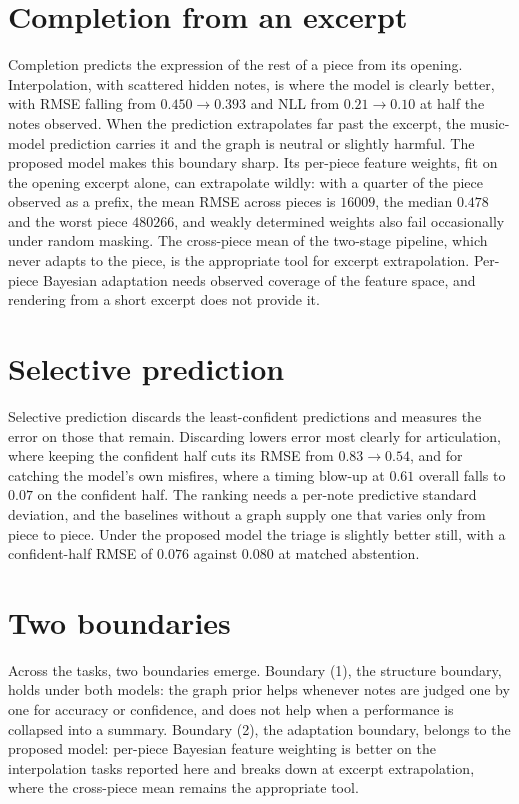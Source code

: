 \documentclass[11pt,a4paper]{report}
\begin{document}
\section{Completion from an excerpt}
Completion predicts the expression of the rest of a piece from its opening.
Interpolation, with scattered hidden notes, is where the model is clearly
better, with RMSE falling from $0.450 \to 0.393$ and NLL from $0.21 \to 0.10$
at half the notes observed. When the prediction extrapolates far past the
excerpt, the music-model prediction carries it and the graph is neutral or
slightly harmful. The proposed model makes this boundary sharp. Its per-piece
feature weights, fit on the opening excerpt alone, can extrapolate wildly:
with a quarter of the piece observed as a prefix, the mean RMSE across
pieces is $16009$, the median $0.478$ and the worst piece $480266$, and
weakly determined weights also fail occasionally under random masking. The
cross-piece mean of the two-stage pipeline, which never adapts to the piece,
is the appropriate tool for excerpt extrapolation. Per-piece Bayesian
adaptation needs observed coverage of the feature space, and rendering from a
short excerpt does not provide it.

\section{Selective prediction}
Selective prediction discards the least-confident predictions and measures
the error on those that remain. Discarding lowers error most clearly for
articulation, where keeping the confident half cuts its RMSE from $0.83 \to
0.54$, and for catching the model's own misfires, where a timing blow-up at
$0.61$ overall falls to $0.07$ on the confident half. The ranking needs a
per-note predictive standard deviation, and the baselines without a graph
supply one that varies only from piece to piece. Under the proposed model the triage is
slightly better still, with a confident-half RMSE of $0.076$ against $0.080$
at matched abstention.

\section{Two boundaries}\label{sec:boundary}
Across the tasks, two boundaries emerge. Boundary (1), the structure
boundary, holds under both models: the graph prior helps whenever notes are
judged one by one for accuracy or confidence, and does not help when a
performance is collapsed into a summary. Boundary (2), the adaptation
boundary, belongs to the proposed model: per-piece Bayesian feature weighting
is better on the interpolation tasks reported here and breaks down at
excerpt extrapolation, where the cross-piece mean remains the appropriate
tool.
\end{document}
